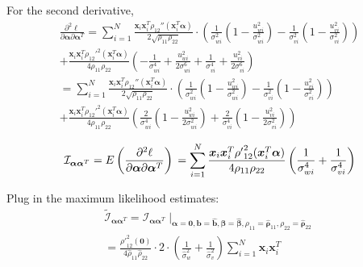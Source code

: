 \documentclass[aoas,preprint]{imsart}
\numberwithin{equation}{section}
\theoremstyle{plain}
\begin{document}
For the second derivative, 
\begin{equation}
    \begin{multlined}
    \frac{\partial^2 \ell}{\partial \bm{\alpha} \partial \bm{\alpha}^T}
    = \sum_{i=1}^{N} \frac{\bm{x}_i \bm{x}_i^T \rho_{12}''(\bm{x}_i^T\bm{\alpha})}{2\sqrt{\rho_{11}\rho_{22}}} \cdot
    \left(
    \frac{1}{\sigma_{wi}^2} \left( 1 - \frac{u_{wi}^2}{\sigma_{wi}^2}\right) - 
    \frac{1}{\sigma_{vi}^2} \left( 1 - \frac{u_{vi}^2}{\sigma_{vi}^2} \right)
    \right)\\
    + \frac{\bm{x}_i \bm{x}_i^T {\rho_{12}'}^2(\bm{x}_i^T\bm{\alpha})}{4\rho_{11}\rho_{22}}
    \left(
    -\frac{1}{\sigma_{wi}^4} + \frac{u_{wi}^2}{2\sigma_{wi}^6} + 
    \frac{1}{\sigma_{vi}^4} + \frac{u_{vi}^2}{2\sigma_{vi}^6}
    \right)\\
    = \sum_{i=1}^{N} \frac{\bm{x}_i \bm{x}_i^T \rho_{12}''(\bm{x}_i^T\bm{\alpha})}{2\sqrt{\rho_{11}\rho_{22}}} \cdot
    \left(
    \frac{1}{\sigma_{wi}^2} \left( 1 - \frac{u_{wi}^2}{\sigma_{wi}^2}\right) - 
    \frac{1}{\sigma_{vi}^2} \left( 1 - \frac{u_{vi}^2}{\sigma_{vi}^2} \right)
    \right)\\
    + \frac{\bm{x}_i \bm{x}_i^T {\rho_{12}'}^2(\bm{x}_i^T\bm{\alpha})}{4\rho_{11}\rho_{22}}
    \left(
    \frac{2}{\sigma_{wi}^4} \left(1-\frac{u_{wi}^2}{2\sigma_{wi}^2}\right)+
    \frac{2}{\sigma_{vi}^4} \left(1-\frac{u_{vi}^2}{2\sigma_{vi}^2}\right)
    \right)
    \end{multlined}
\end{equation}

\begin{equation}
    \mathcal{I}_{\bm{\alpha}\bm{\alpha}^T} = E\left(\frac{\partial^2 \ell}{\partial \bm{\alpha} \partial \bm{\alpha}^T}\right)\\
    = \sum_{i=1}^{N} \frac{\bm{x}_i \bm{x}_i^T {\rho '}^2_{12}(\bm{x}_i^T\bm{\alpha})}{4\rho_{11}\rho_{22}} \left(
    \frac{1}{\sigma_{wi}^4} + \frac{1}{\sigma_{vi}^4}
    \right)
\end{equation}

Plug in the maximum likelihood estimates:
\begin{equation}
\begin{multlined}
        \tilde{\mathcal{I}}_{\bm{\alpha}\bm{\alpha}^T} = \mathcal{I}_{\bm{\alpha}\bm{\alpha}^T}\mid_{
        \bm{\alpha}=\bm{0}, 
        \bm{b} = \bm{\hat{b}},
        \bm{\beta} = \bm{\hat{\beta}},
        {\rho}_{11} = \bm{\hat{\rho}}_{11},
        {\rho}_{22} = \bm{\hat{\rho}}_{22}}\\
        = \frac{{\rho '}^2_{12}(\bm{0})}{4\hat{\rho}_{11}\hat{\rho}_{22}}\cdot 2 \cdot \left(\frac{1}{\hat{\sigma}_{w}^2} + \frac{1}{\hat{\sigma}_{v}^2} \right) \sum_{i=1}^{N} \bm{x}_i \bm{x}_i^T
    \end{multlined}
\end{equation}
\end{document}
